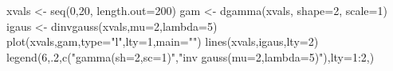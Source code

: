 \begin{Schunk}
\begin{Sinput}
 xvals <- seq(0,20, length.out=200)
 gam <- dgamma(xvals, shape=2, scale=1)
 igaus <- dinvgauss(xvals,mu=2,lambda=5)
 plot(xvals,gam,type="l",lty=1,main="")
 lines(xvals,igaus,lty=2)
 legend(6,.2,c("gamma(sh=2,sc=1)","inv gauss(mu=2,lambda=5)"),lty=1:2,)
 
\end{Sinput}
\end{Schunk}
